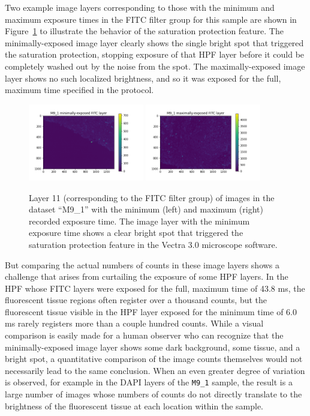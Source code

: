 \documentclass[letterpaper,11pt]{article}
\newcommand{\reffig}[1]{Figure~\ref{#1}}
\begin{document}
Two example image layers corresponding to those with the minimum and maximum exposure times in the FITC filter group for this sample are shown in \reffig{fig:max_min_M9_1_images} to illustrate the behavior of the saturation protection feature. The minimally-exposed image layer clearly shows the single bright spot that triggered the saturation protection, stopping exposure of that HPF layer before it could be completely washed out by the noise from the spot. The maximally-exposed image layer shows no such localized brightness, and so it was exposed for the full, maximum time specified in the protocol.

\begin{figure}[!ht]
\centering
\includegraphics[width=0.45\textwidth]{images/introduction/min_exposure_M9_1_image}
\includegraphics[width=0.45\textwidth]{images/introduction/max_exposure_M9_1_image}
\caption{\footnotesize Layer 11 (corresponding to the FITC filter group) of images in the dataset ``M9\_1'' with the minimum (left) and maximum (right) recorded exposure time. The image layer with the minimum exposure time shows a clear bright spot that triggered the saturation protection feature in the Vectra 3.0 microscope software.}
\label{fig:max_min_M9_1_images}
\end{figure}

But comparing the actual numbers of counts in these image layers shows a challenge that arises from curtailing the exposure of some HPF layers. In the HPF whose FITC layers were exposed for the full, maximum time of 43.8 ms, the fluorescent tissue regions often register over a thousand counts, but the fluorescent tissue visible in the HPF layer exposed for the minimum time of 6.0 ms rarely registers more than a couple hundred counts. While a visual comparison is easily made for a human observer who can recognize that the minimally-exposed image layer shows some dark background, some tissue, and a bright spot, a quantitative comparison of the image counts themselves would not necessarily lead to the same conclusion. When an even greater degree of variation is observed, for example in the DAPI layers of the \texttt{M9\_1} sample, the result is a large number of images whose numbers of counts do not directly translate to the brightness of the fluorescent tissue at each location within the sample.
\end{document}
